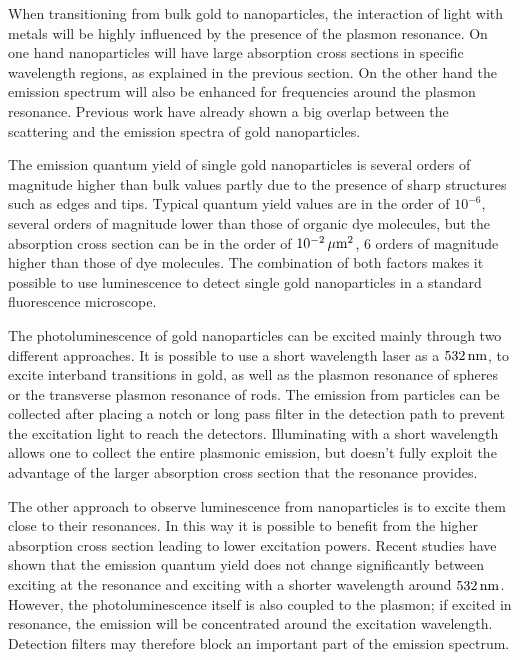 When transitioning from bulk gold to nanoparticles, the interaction of light
with metals will be highly influenced by the presence of the plasmon
resonance\cite{Dulkeith2004}. On one hand nanoparticles will have large
absorption cross sections in specific wavelength regions, as explained in the
previous section. On the other hand the emission spectrum will also be enhanced
for frequencies around the plasmon resonance. Previous work have already shown
a big overlap between the scattering and the emission spectra of gold
nanoparticles\cite{Yorulmaz2012}.

The emission quantum yield of single gold nanoparticles is several orders of
magnitude higher than bulk values partly due to the presence of sharp structures
such as edges and tips. Typical quantum yield values are in the order of
$10^{-6}$\cite{Yorulmaz2012}, several orders of magnitude lower than those of
organic dye molecules, but the absorption cross section can be in the order of
$10^{-2}\,\mu\textrm{m}^2$, $6$ orders of magnitude higher than those of dye molecules. The
combination of both factors makes it possible to use luminescence to detect
single gold nanoparticles in a standard fluorescence microscope.

The photoluminescence of gold nanoparticles can be excited mainly through two
different approaches. It is possible to use a short wavelength laser as a
$532\,\textrm{nm}$, to excite interband transitions in gold\cite{Beversluis2003a}, as well
as the plasmon resonance of spheres or the transverse plasmon resonance of rods.
The emission from particles can be collected after placing a notch or long pass
filter in the detection path to prevent the excitation light to reach the
detectors. Illuminating with a short wavelength allows one to collect the entire
plasmonic emission, but doesn't fully exploit the advantage of the larger
absorption cross section that the resonance provides.

The other approach to observe luminescence from nanoparticles is to excite them
close to their resonances. In this way it is possible to benefit from the higher
absorption cross section leading to lower excitation powers. Recent studies have
shown that the emission quantum yield does not change significantly between
exciting at the resonance and exciting with a shorter wavelength around
$532\,\textrm{nm}$\cite{Cheng2015}. However, the photoluminescence itself is also coupled
to the plasmon; if excited in resonance, the emission will be concentrated
around the excitation wavelength\cite{Sundararaman2014}. Detection filters may
therefore block an important part of the emission spectrum.

